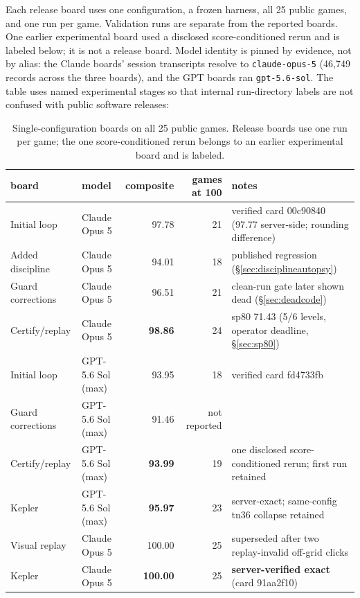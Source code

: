 \documentclass[11pt]{article}
\begin{document}
Each release board uses one configuration, a frozen harness, all 25 public games, and one run per game. Validation runs are separate from the reported boards. One earlier experimental board used a disclosed score-conditioned rerun and is labeled below; it is not a release board. Model identity is pinned by evidence, not by alias: the Claude boards' session transcripts resolve to \texttt{claude-opus-5} (46{,}749 records across the three boards), and the GPT boards ran \texttt{gpt-5.6-sol}. The table uses named experimental stages so that internal run-directory labels are not confused with public software releases:

\begin{table}[ht]
  \centering
  \caption{Single-configuration boards on all 25 public games. Release boards use one run per game; the one score-conditioned rerun belongs to an earlier experimental board and is labeled.}
  \label{tab:boards}
  \small
  \begin{tabular}{llrrp{5.1cm}}
    \toprule
    board & model & composite & games at 100 & notes \\
    \midrule
    Initial loop & Claude Opus 5 & 97.78 & 21 & verified card 00c90840 (97.77 server-side; rounding difference) \\
    Added discipline & Claude Opus 5 & 94.01 & 18 & published regression (\S\ref{sec:disciplineautopsy}) \\
    Guard corrections & Claude Opus 5 & 96.51 & 21 & clean-run gate later shown dead (\S\ref{sec:deadcode}) \\
    Certify/replay & Claude Opus 5 & \textbf{98.86} & 24 & sp80 71.43 (5/6 levels, operator deadline, \S\ref{sec:sp80}) \\
    Initial loop & GPT-5.6 Sol (max) & 93.95 & 18 & verified card fd4733fb \\
    Guard corrections & GPT-5.6 Sol (max) & 91.46 & not reported & \\
    Certify/replay & GPT-5.6 Sol (max) & \textbf{93.99} & 19 & one disclosed score-conditioned rerun; first run retained \\
    Kepler & GPT-5.6 Sol (max) & \textbf{95.97} & 23 & server-exact; same-config tn36 collapse retained \\
    Visual replay & Claude Opus 5 & 100.00 & 25 & superseded after two replay-invalid off-grid clicks \\
    Kepler & Claude Opus 5 & \textbf{100.00} & 25 & \textbf{server-verified exact} (card 91aa2f10) \\
    \bottomrule
  \end{tabular}
\end{table}
\end{document}
